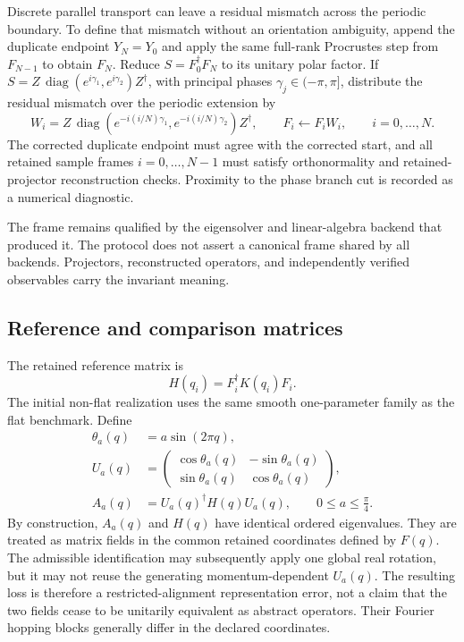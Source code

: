 \documentclass[11pt]{article}
\begin{document}
Discrete parallel transport can leave a residual mismatch across the periodic boundary.
To define that mismatch without an orientation ambiguity, append the duplicate endpoint
$Y_N=Y_0$ and apply the same full-rank Procrustes step from $F_{N-1}$ to obtain $F_N$.
Reduce $S=F_0^\dagger F_N$ to its unitary polar factor. If
$S=Z\,\operatorname{diag}(e^{i\gamma_1},e^{i\gamma_2})Z^\dagger$, with principal phases
$\gamma_j\in(-\pi,\pi]$, distribute the residual mismatch over the periodic extension by
\begin{equation}
 W_i=Z\,\operatorname{diag}
 \left(e^{-i(i/N)\gamma_1},e^{-i(i/N)\gamma_2}\right)Z^\dagger,
 \qquad F_i\leftarrow F_iW_i,
 \qquad i=0,\ldots,N.
 \label{eq:closure-correction}
\end{equation}
The corrected duplicate endpoint must agree with the corrected start, and all retained
sample frames $i=0,\ldots,N-1$ must satisfy orthonormality and retained-projector
reconstruction checks. Proximity to the phase branch cut is recorded as a numerical
diagnostic.

The frame remains qualified by the eigensolver and linear-algebra backend that produced
it. The protocol does not assert a canonical frame shared by all backends. Projectors,
reconstructed operators, and independently verified observables carry the invariant
meaning.

\subsection{Reference and comparison matrices}

The retained reference matrix is
\begin{equation}
 H(q_i)=F_i^\dagger K(q_i)F_i.
 \label{eq:reference-matrix}
\end{equation}
The initial non-flat realization uses the same smooth one-parameter family as the flat
benchmark. Define
\begin{align}
 \theta_a(q)&=a\sin(2\pi q),\\
 U_a(q)&=
 \begin{pmatrix}
 \cos\theta_a(q)&-\sin\theta_a(q)\\
 \sin\theta_a(q)& \cos\theta_a(q)
 \end{pmatrix},\\
 A_a(q)&=U_a(q)^\dagger H(q)U_a(q),
 \qquad 0\le a\le\frac\pi4.
 \label{eq:attacked-matrix}
\end{align}
By construction, $A_a(q)$ and $H(q)$ have identical ordered eigenvalues. They are treated
as matrix fields in the common retained coordinates defined by $F(q)$. The admissible
identification may subsequently apply one global real rotation, but it may not reuse the
generating momentum-dependent $U_a(q)$. The resulting loss is therefore a
restricted-alignment representation error, not a claim that the two fields cease to be
unitarily equivalent as abstract operators. Their Fourier hopping blocks generally
differ in the declared coordinates.
\end{document}
